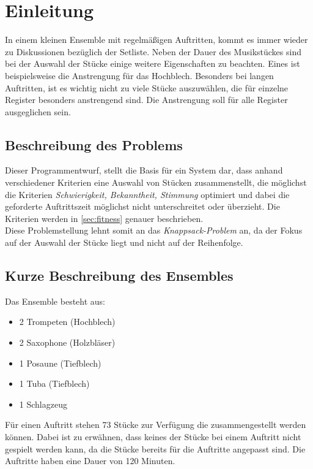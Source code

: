 \section{Einleitung}\label{sec:einleitung}
In einem kleinen Ensemble mit regelmäßigen Auftritten, kommt es immer wieder zu Diskussionen 
bezüglich der Setliste. Neben der Dauer des Musikstückes sind bei der Auswahl der Stücke einige 
weitere Eigenschaften zu beachten. Eines ist beispielsweise die Anstrengung für das Hochblech. 
Besonders bei langen Auftritten, ist es wichtig nicht zu viele Stücke auszuwählen, die 
für einzelne Register besonders anstrengend sind. Die Anstrengung soll für alle Register ausgeglichen sein.
\subsection{Beschreibung des Problems}
 Dieser Programmentwurf, stellt die Basis für ein System dar, dass anhand verschiedener Kriterien eine 
 Auswahl von Stücken zusammenstellt, die möglichst die Kriterien \emph{Schwierigkeit, Bekanntheit, Stimmung} optimiert und dabei die 
 geforderte Auftrittszeit möglichst nicht unterschreitet oder überzieht. Die Kriterien werden in \autoref{sec:fitness} genauer 
 beschrieben.\\
 Diese Problemstellung lehnt somit an das \textit{Knappsack-Problem} an, 
 da der Fokus auf der Auswahl der Stücke liegt und nicht auf der Reihenfolge.
 
\subsection{Kurze Beschreibung des Ensembles}
Das Ensemble besteht aus: 
\begin{itemize}
    \item 2 Trompeten (Hochblech)
    \item 2 Saxophone (Holzbläser)
    \item 1 Posaune (Tiefblech)
    \item 1 Tuba (Tiefblech)
    \item 1 Schlagzeug 
\end{itemize} 

Für einen Auftritt stehen 73 Stücke zur Verfügung die zusammengestellt werden können. Dabei ist zu erwähnen, dass keines
der Stücke bei einem Auftritt nicht gespielt werden kann, da die Stücke bereits für die Auftritte angepasst sind.
Die Auftritte haben eine Dauer von 120 Minuten.
